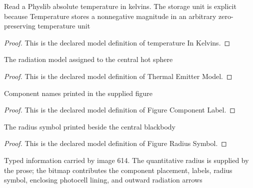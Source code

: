 \begin{definition}
  \label{def:physics:phyx-mini-0614:phyxminiproblems-problemphyxmini0614-temperatureinkelvins}
  Read a Physlib absolute temperature in kelvins. The storage unit is explicit because Temperature stores a nonnegative magnitude in an arbitrary zero-preserving temperature unit
\end{definition}
\begin{proof}
  This is the declared model definition of temperature In Kelvins.
\end{proof}
\begin{definition}
  \label{def:physics:phyx-mini-0614:phyxminiproblems-problemphyxmini0614-thermalemittermodel}
  The radiation model assigned to the central hot sphere
\end{definition}
\begin{proof}
  This is the declared model definition of Thermal Emitter Model.
\end{proof}
\begin{definition}
  \label{def:physics:phyx-mini-0614:phyxminiproblems-problemphyxmini0614-figurecomponentlabel}
  Component names printed in the supplied figure
\end{definition}
\begin{proof}
  This is the declared model definition of Figure Component Label.
\end{proof}
\begin{definition}
  \label{def:physics:phyx-mini-0614:phyxminiproblems-problemphyxmini0614-figureradiussymbol}
  The radius symbol printed beside the central blackbody
\end{definition}
\begin{proof}
  This is the declared model definition of Figure Radius Symbol.
\end{proof}
\begin{definition}
  \label{def:physics:phyx-mini-0614:phyxminiproblems-problemphyxmini0614-blackbodyphotocellfigure}
  Typed information carried by image 614. The quantitative radius is supplied by the prose; the bitmap contributes the component placement, labels, radius symbol, enclosing photocell lining, and outward radiation arrows
\end{definition}
